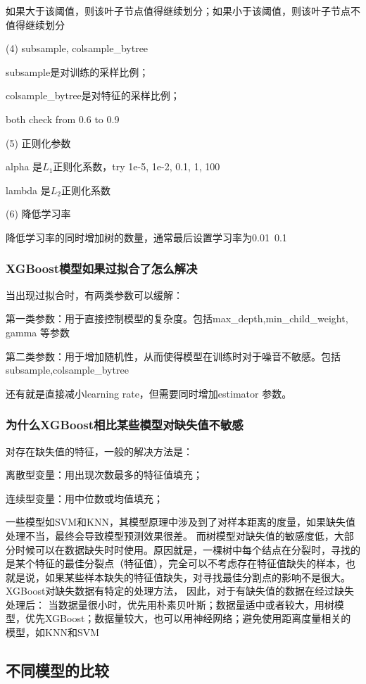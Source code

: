 \documentclass[12pt]{article}
\begin{document}
如果大于该阈值，则该叶子节点值得继续划分；如果小于该阈值，则该叶子节点不值得继续划分

(4) subsample, colsample\_bytree

subsample是对训练的采样比例；

colsample\_bytree是对特征的采样比例；

both check from 0.6 to 0.9

(5) 正则化参数

alpha 是$L_1$正则化系数，try 1e-5, 1e-2, 0.1, 1, 100

lambda 是$L_2$正则化系数

(6) 降低学习率

降低学习率的同时增加树的数量，通常最后设置学习率为0.01~0.1


\subsubsection{XGBoost模型如果过拟合了怎么解决}
当出现过拟合时，有两类参数可以缓解：

第一类参数：用于直接控制模型的复杂度。包括max\_depth,min\_child\_weight,  gamma 等参数

第二类参数：用于增加随机性，从而使得模型在训练时对于噪音不敏感。包括subsample,colsample\_bytree

还有就是直接减小learning rate，但需要同时增加estimator 参数。

\subsubsection{为什么XGBoost相比某些模型对缺失值不敏感}
对存在缺失值的特征，一般的解决方法是：

离散型变量：用出现次数最多的特征值填充；

连续型变量：用中位数或均值填充；

一些模型如SVM和KNN，其模型原理中涉及到了对样本距离的度量，如果缺失值处理不当，最终会导致模型预测效果很差。
而树模型对缺失值的敏感度低，大部分时候可以在数据缺失时时使用。原因就是，一棵树中每个结点在分裂时，寻找的是某个特征的最佳分裂点（特征值），完全可以不考虑存在特征值缺失的样本，也就是说，如果某些样本缺失的特征值缺失，对寻找最佳分割点的影响不是很大。
XGBoost对缺失数据有特定的处理方法，
因此，对于有缺失值的数据在经过缺失处理后：
当数据量很小时，优先用朴素贝叶斯；数据量适中或者较大，用树模型，优先XGBoost；数据量较大，也可以用神经网络；避免使用距离度量相关的模型，如KNN和SVM


\subsection{不同模型的比较}
\end{document}
